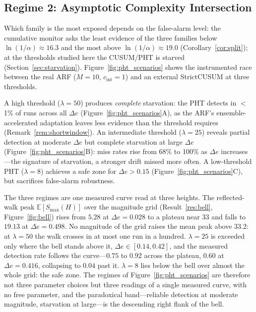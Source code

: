 \documentclass[smallextended]{svjour3}
\begin{document}
\subsection{Regime 2: Asymptotic Complexity Intersection}\label{sec:complexity}

Which family is the most exposed depends on the false-alarm level: the cumulative monitor asks the least evidence of the three families below $\ln(1/\alpha) \approx 16.3$ and the most above $\ln(1/\alpha) \approx 19.0$ (Corollary~\ref{cor:split}); at the thresholds studied here the CUSUM/PHT is starved (Section~\ref{sec:starvation}).
Figure~\ref{fig:pht_scenarios} shows the instrumented race between the real ARF ($M = 10$, $c_{\mathrm{int}} = 1$) and an external StrictCUSUM at three thresholds.

A high threshold ($\lambda = 50$) produces \emph{complete} starvation: the PHT detects in $<$1\% of runs across all $\Delta e$ (Figure~\ref{fig:pht_scenarios}A), as the ARF's ensemble-accelerated adaptation leaves less evidence than the threshold requires (Remark~\ref{rem:shortwindow}). An intermediate threshold ($\lambda = 25$) reveals partial detection at moderate $\Delta e$ but complete starvation at large $\Delta e$ (Figure~\ref{fig:pht_scenarios}B): miss rates rise from 68\% to 100\% as $\Delta e$ increases---the signature of starvation, a stronger drift missed more often. A low-threshold PHT ($\lambda = 8$) achieves a safe zone for $\Delta e > 0.15$ (Figure~\ref{fig:pht_scenarios}C), but sacrifices false-alarm robustness.

The three regimes are one measured curve read at three heights. The reflected-walk peak $\mathbb{E}[S_{\max}(H)]$ over the magnitude grid (Result~\ref{res:bell}, Figure~\ref{fig:bell}) rises from $5.28$ at $\Delta e = 0.028$ to a plateau near $33$ and falls to $19.13$ at $\Delta e = 0.498$. No magnitude of the grid raises the mean peak above $33.2$: at $\lambda = 50$ the walk crosses in at most one run in a hundred. $\lambda = 25$ is exceeded only where the bell stands above it, $\Delta e \in [0.14, 0.42]$, and the measured detection rate follows the curve---$0.75$ to $0.92$ across the plateau, $0.60$ at $\Delta e = 0.416$, collapsing to $0.04$ past it. $\lambda = 8$ lies below the bell over almost the whole grid: the safe zone. The regimes of Figure~\ref{fig:pht_scenarios} are therefore not three parameter choices but three readings of a single measured curve, with no free parameter, and the paradoxical band---reliable detection at moderate magnitude, starvation at large---is the descending right flank of the bell.
\end{document}
